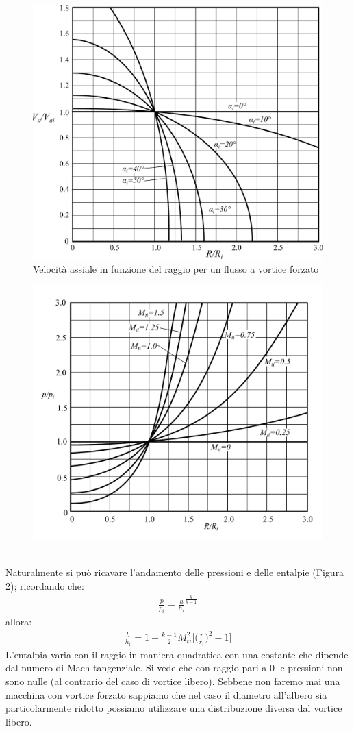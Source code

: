 \begin{figure}
\centering
  \includegraphics[width=.8\textwidth]{fig/VortForz.pdf}
\caption{Velocità assiale in funzione del raggio per un flusso a vortice forzato}
\label{fig:TurboFan}
\end{figure}
\begin{figure}
\centering
  \includegraphics[width=.8\textwidth]{fig/PVortForz.pdf}
\caption{}
\label{fig:PVortForz}
\end{figure}
\\Naturalmente si può ricavare l'andamento delle pressioni e delle entalpie (Figura \ref{fig:PVortForz}); ricordando che:
\begin{align*}
\frac{p}{p_i} = \frac{h}{h_i}^{\frac{k}{k-1}}
\end{align*}
allora:
\begin{align*}
\frac{h}{h_i} = 1 + \frac{k-1}{2} M_{ti}^2 \bigg[ \bigg(\frac{r}{r_i} \bigg)^2-1 \bigg]
\end{align*}
L'entalpia varia con il raggio in maniera quadratica con una costante che dipende dal numero di Mach tangenziale. Si vede che con raggio pari a $0$ le pressioni non sono nulle (al contrario del caso di vortice libero). Sebbene non faremo mai una macchina con vortice forzato sappiamo che nel caso il diametro all'albero sia particolarmente ridotto possiamo utilizzare una distribuzione diversa dal vortice libero. 

